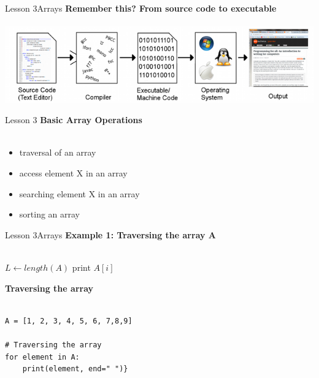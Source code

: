 \documentclass[aspectratio=1610]{beamer}
\begin{document}
\begin{frame}{Lesson 3}{Arrays}
\Large
\textbf{Remember this? From source code to executable}\\~\\ 
\includegraphics[scale=0.65]{Images/CompilationChain}
\end{frame}



\begin{frame}{Lesson 3}{}
\LARGE
\textbf{Basic Array Operations}\\~\\
\begin{itemize}
	\item traversal of an array
	\item access element X in an array
	\item searching element X in an array
	\item sorting an array
\end{itemize}
\end{frame}



\begin{frame}{Lesson 3}{Arrays}
\Large
\textbf{Example 1: Traversing the array A}\\~\\

\label{getArray}
\begin{algorithmic}[1]
 
\State $L\gets length(A)$
    \State print $A[i]$
\EndFor
\EndProcedure
\end{algorithmic}
\end{frame}


\begin{frame}[fragile]
\LARGE
\textbf{Traversing the array}\\~\\
\Large
\begin{lstlisting}
A = [1, 2, 3, 4, 5, 6, 7,8,9]

# Traversing the array
for element in A:
    print(element, end=" ")}
\end{lstlisting}
\end{frame}
\end{document}

